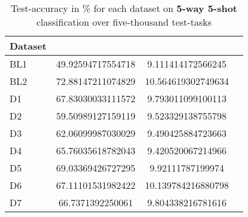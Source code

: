 \begin{table}[h]
\centering
\caption{Test-accuracy in \% for each dataset on \textbf{5-way 5-shot} classification over five-thousand test-tasks}
\label{accfivefive}
\begin{tabular}{l *{3}{S}}
    \hline
    Dataset &  &   & 
    \\\hline
    BL1  & 49.92594717554718 &     9.111414172566245 &     
    \\
    BL2  & 72.88147211074829 &   10.564619302749634 &     
    \\
    D1 & 67.83030033111572 &    9.793011099100113 &     
    \\
    D2   & 59.50989127159119 &    9.523329138755798 &    
    \\
    D3   & 62.06099987030029 &    9.490425884723663 &    
    \\
    D4   & 65.76035618782043 &    9.420520067214966 &    
    \\
    D5   & 69.03369426727295 &    9.92111787199974 &     
    \\
    D6   & 67.11101531982422 &    10.139784216880798 &    
    \\
    D7   & 66.7371392250061 &     9.804338216781616 &    
    \\\hline   
\end{tabular}
\end{table}


